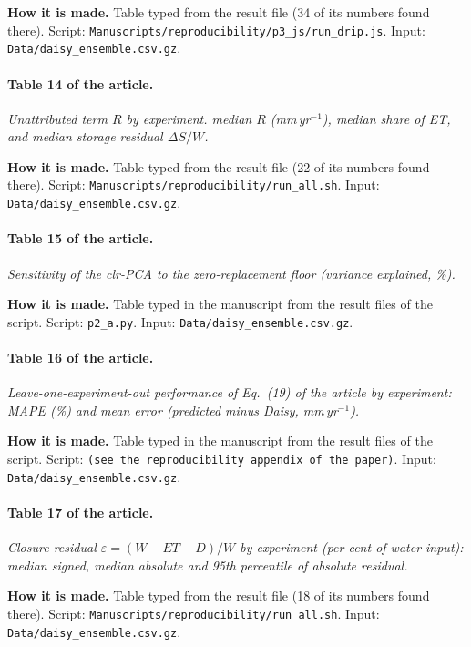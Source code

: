\textbf{How it is made.} Table typed from the result file (34 of its numbers found there). Script: \nolinkurl{Manuscripts/reproducibility/p3_js/run_drip.js}. Input: \nolinkurl{Data/daisy_ensemble.csv.gz}.

\paragraph{Table 14 of the article.} \emph{Unattributed term $R$ by experiment. median $R$ (mm\,yr$^{-1}$), median share of ET, and median storage residual $\Delta S/W$.}

\textbf{How it is made.} Table typed from the result file (22 of its numbers found there). Script: \nolinkurl{Manuscripts/reproducibility/run_all.sh}. Input: \nolinkurl{Data/daisy_ensemble.csv.gz}.

\paragraph{Table 15 of the article.} \emph{Sensitivity of the clr-PCA to the zero-replacement floor (variance explained, \%).}

\textbf{How it is made.} Table typed in the manuscript from the result files of the script. Script: \nolinkurl{p2_a.py}. Input: \nolinkurl{Data/daisy_ensemble.csv.gz}.

\paragraph{Table 16 of the article.} \emph{Leave-one-experiment-out performance of Eq.~(19) of the article by experiment: MAPE (\%) and mean error (predicted minus Daisy, mm\,yr$^{-1}$).}

\textbf{How it is made.} Table typed in the manuscript from the result files of the script. Script: \nolinkurl{(see the reproducibility appendix of the paper)}. Input: \nolinkurl{Data/daisy_ensemble.csv.gz}.

\paragraph{Table 17 of the article.} \emph{Closure residual $\varepsilon=(W-\mathit{ET}-D)/W$ by experiment (per cent of water input): median signed, median absolute and 95th percentile of absolute residual.}

\textbf{How it is made.} Table typed from the result file (18 of its numbers found there). Script: \nolinkurl{Manuscripts/reproducibility/run_all.sh}. Input: \nolinkurl{Data/daisy_ensemble.csv.gz}.

